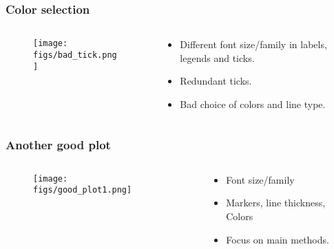\documentclass[hyperref={pdfpagelayout=SinglePage}]{beamer}
\begin{document}
\begin{frame}[fragile]
\frametitle{Color selection}

\begin{columns}

    \begin{column}{0.4\textwidth}
    \begin{figure}
        \texttt{[image: figs/bad\_tick.png]}
    \end{figure}
    \end{column}
    \begin{column}{0.6\textwidth}
    \begin{itemize}
        \item Different font size/family in labels, legends and ticks.
        \item Redundant ticks.
        \item Bad choice of colors and line type.
    \end{itemize}

    \end{column}
\end{columns}
\end{frame}

\begin{frame}[fragile]
\frametitle{Another good plot}

\begin{columns}

    \begin{column}{0.6\textwidth}
    \begin{figure}
        \texttt{[image: figs/good\_plot1.png]}
    \end{figure}
    \end{column}
    \begin{column}{0.4\textwidth}
    \begin{itemize}
        \item Font size/family
        \item Markers, line thickness, Colors
        \item Focus on main methods.
    \end{itemize}

    \end{column}
\end{columns}
\end{frame}
\end{document}
